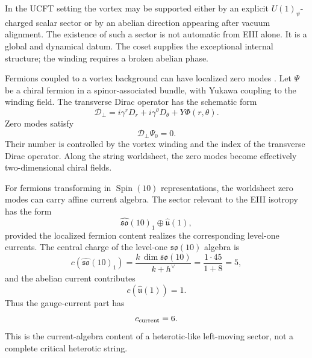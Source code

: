 \documentclass[aps,prd,preprint,longbibliography,nofootinbib,superscriptaddress,floatfix]{revtex4-2}
\newcommand{\Spin}{\operatorname{Spin}}
\begin{document}
In the UCFT setting the vortex may be supported either by an explicit
\(U(1)_\psi\)-charged scalar sector or by an abelian direction appearing after
vacuum alignment. The existence of such a sector is not automatic from EIII
alone. It is a global and dynamical datum. The coset supplies the exceptional
internal structure; the winding requires a broken abelian phase.

Fermions coupled to a vortex background can have localized zero modes
\cite{JackiwRossi,WittenSuperconducting}. Let \(\Psi\) be a chiral fermion in a
spinor-associated bundle, with Yukawa coupling to the winding field. The
transverse Dirac operator has the schematic form
\begin{equation}
    \mathcal D_\perp
    =
    i\gamma^rD_r+i\gamma^\theta D_\theta
    +
    Y\Phi(r,\theta).
    \label{eq:soliton_transverse_dirac}
\end{equation}
Zero modes satisfy
\begin{equation}
    \mathcal D_\perp\Psi_0=0 .
    \label{eq:soliton_zero_mode_equation}
\end{equation}
Their number is controlled by the vortex winding and the index of the
transverse Dirac operator. Along the string worldsheet, the zero modes become
effectively two-dimensional chiral fields.

For fermions transforming in \(\Spin(10)\) representations, the worldsheet
zero modes can carry affine current algebra. The sector relevant to the EIII
isotropy has the form
\begin{equation}
    \widehat{\mathfrak{so}}(10)_1
    \oplus
    \widehat{\mathfrak u}(1),
    \label{eq:soliton_current_algebra}
\end{equation}
provided the localized fermion content realizes the corresponding level-one
currents. The central charge of the level-one \(\mathfrak{so}(10)\) algebra is
\begin{equation}
    c\!\left(\widehat{\mathfrak{so}}(10)_1\right)
    =
    \frac{k\,\dim\mathfrak{so}(10)}
    {k+h^\vee}
    =
    \frac{1\cdot 45}{1+8}
    =
    5,
    \label{eq:soliton_so10_central_charge}
\end{equation}
and the abelian current contributes
\begin{equation}
    c\!\left(\widehat{\mathfrak u}(1)\right)=1.
    \label{eq:soliton_u1_central_charge}
\end{equation}
Thus the gauge-current part has
\begin{equation}
    c_{\rm current}=6.
    \label{eq:soliton_total_current_c}
\end{equation}
This is the current-algebra content of a heterotic-like left-moving sector,
not a complete critical heterotic string.
\end{document}
